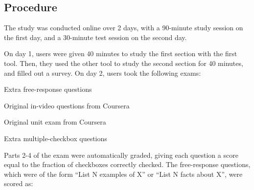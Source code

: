 \documentclass{chi-ext}
\begin{document}
\subsection{Procedure}

The study was conducted online over 2 days, with a 90-minute study session on the first day, and a 30-minute test session on the second day. %

On day 1, users were given 40 minutes to study the first section with the first tool. Then, they used the other tool to study the second section for 40 minutes, and filled out a survey. On day 2, users took the following exams:


\begin{compactenum}
\item Extra free-response questions %
\item Original in-video questions from Coursera%
\item Original unit exam from Coursera%
\item Extra multiple-checkbox questions %
\end{compactenum}

Parts 2-4 of the exam were automatically graded, giving each question a score equal to the fraction of checkboxes correctly checked. %
The free-response questions, which were of the form ``List N examples of X'' or ``List N facts about X'', were scored as:

\vspace{-4mm}
\end{document}
